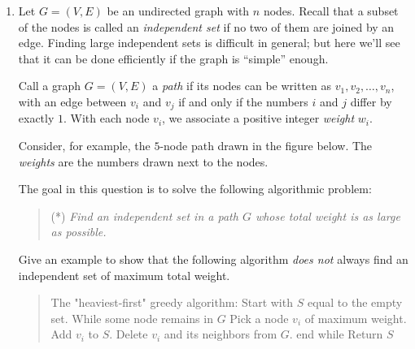 \documentclass[12pt]{article}
\begin{document}
\begin{enumerate}
{An analogous observation holds if the optimal plan ends in SF.
Thus, if $OPT_N(j)$ denotes the minimum cost of a plan
on months $1, \ldots, j$ ending in NY, and
$OPT_S(j)$ denotes the minimum cost of a plan
on months $1, \ldots, j$ ending in SF, then
$$OPT_N(n) = N_n + \min(OPT_N(n-1), M + OPT_S(n-1))$$
$$OPT_S(n) = S_n + \min(OPT_S(n-1), M + OPT_N(n-1))$$
This can be translated directly into an algorithm:
\begin{quote}
\begin{code}
$OPT_N(0) = OPT_S(0) = 0$
For $i = 1, \ldots, n$
  $OPT_N(i) = N_i + \min(OPT_N(i-1), M + OPT_S(i-1))$
  $OPT_S(i) = S_i + \min(OPT_S(i-1), M + OPT_N(i-1))$
End
Return the smaller of $OPT_N(n)$ and $OPT_S(n)$
\end{code}
\end{quote}
The algorithm has $n$ iterations, and each takes constant
time.  Thus the running time is $O(n)$.

}


\item

Let $G = (V,E)$ be an undirected graph with $n$ nodes.
Recall that a subset of the nodes is called an {\em independent set}
if no two of them are joined by an edge.
Finding large independent sets is difficult in general;
but here we'll see that it can be done efficiently if the
graph is ``simple'' enough.

Call a graph $G = (V,E)$ a {\em path} if its nodes can be
written as $v_1, v_2, \ldots, v_n$, with an edge between
$v_i$ and $v_j$ if and only if the numbers $i$ and $j$ differ by exactly $1$.
With each node $v_i$, we associate a positive integer {\em weight} $w_i$.

Consider, for example, the $5$-node path drawn in the figure below.
The {\em weights} are the numbers drawn next to the nodes.

The goal in this question is to solve the following algorithmic
problem:
\begin{quote}
(*) {\em Find an independent set in a path $G$ whose total weight is as large
as possible.}
\end{quote}

Give an example to show that the following algorithm
{\em does not} always find an independent set of maximum
total weight.
\begin{quote}
\begin{code}
The "heaviest-first" greedy algorithm:
  Start with $S$ equal to the empty set.
  While some node remains in $G$
    Pick a node $v_i$ of maximum weight.
    Add $v_i$ to $S$.
    Delete $v_i$ and its neighbors from $G$.
  end while
  Return $S$
\end{code}
\end{quote}


\end{enumerate}
\end{document}

